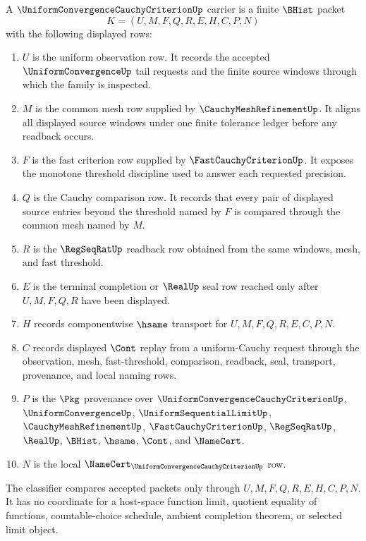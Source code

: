 \begin{definition}
\label{def:uniform-convergence-cauchy-criterion-carrier}
A $\UniformConvergenceCauchyCriterionUp$ carrier is a finite $\BHist$ packet
$$
K=(U,M,F,Q,R,E,H,C,P,N)
$$
with the following displayed rows:
\begin{enumerate}
\item $U$ is the uniform observation row. It records the accepted $\UniformConvergenceUp$ tail requests and the finite source windows through which the family is inspected.
\item $M$ is the common mesh row supplied by $\CauchyMeshRefinementUp$. It aligns all displayed source windows under one finite tolerance ledger before any readback occurs.
\item $F$ is the fast criterion row supplied by $\FastCauchyCriterionUp$. It exposes the monotone threshold discipline used to answer each requested precision.
\item $Q$ is the Cauchy comparison row. It records that every pair of displayed source entries beyond the threshold named by $F$ is compared through the common mesh named by $M$.
\item $R$ is the $\RegSeqRatUp$ readback row obtained from the same windows, mesh, and fast threshold.
\item $E$ is the terminal completion or $\RealUp$ seal row reached only after $U,M,F,Q,R$ have been displayed.
\item $H$ records componentwise $\hsame$ transport for $U,M,F,Q,R,E,C,P,N$.
\item $C$ records displayed $\Cont$ replay from a uniform-Cauchy request through the observation, mesh, fast-threshold, comparison, readback, seal, transport, provenance, and local naming rows.
\item $P$ is the $\Pkg$ provenance over $\UniformConvergenceCauchyCriterionUp$, $\UniformConvergenceUp$, $\UniformSequentialLimitUp$, $\CauchyMeshRefinementUp$, $\FastCauchyCriterionUp$, $\RegSeqRatUp$, $\RealUp$, $\BHist$, $\hsame$, $\Cont$, and $\NameCert$.
\item $N$ is the local $\NameCert_{\UniformConvergenceCauchyCriterionUp}$ row.
\end{enumerate}
The classifier compares accepted packets only through $U,M,F,Q,R,E,H,C,P,N$. It has no coordinate for a host-space function limit, quotient equality of functions, countable-choice schedule, ambient completion theorem, or selected limit object.
\end{definition}


